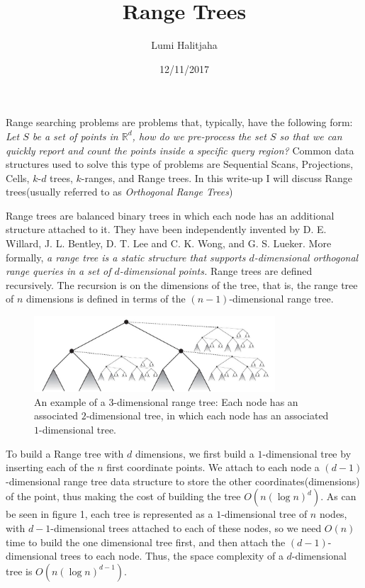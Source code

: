\documentclass[letterpaper,11pt]{article}
\title{Range Trees}
\author{Lumi Halitjaha}
\date{12/11/2017}
\begin{document}
\maketitle

Range searching problems are problems that, typically, have the following form: \textit{Let $S$ be a set of points in $\mathbb{R}^d$, how do we pre-process the set $S$ so that we can quickly report and count the points inside a specific query region?}\cite{chazelle1999advances} Common data structures used to solve this type of problems are Sequential Scans, Projections, Cells, $k$-$d$ trees, $k$-ranges, and Range trees.\cite[p.~398]{Friedman} In this write-up I will discuss Range trees(usually referred to as \textit{Orthogonal Range Trees})

Range trees are balanced binary trees in which each node has an additional structure attached to it.\cite{sturzurange} They have been independently invented by D. E. Willard, J. L. Bentley, D. T. Lee and C. K. Wong, and G. S. Lueker.\cite{willard}\cite[p.~404]{Friedman} More formally, \textit{a range tree is a static structure that supports $d$-dimensional orthogonal range queries in a set of $d$-dimensional points.}\cite{brass2008advanced} Range trees are defined recursively. The recursion is on the dimensions of the tree, that is, the range tree of $n$ dimensions is defined in terms of the $(n-1)$-dimensional range tree.\cite[p.~404]{Friedman}
\begin{figure}[ht!]
\centering
\includegraphics[width=90mm]{range_tree.JPG}
\caption{An example of a $3$-dimensional range tree: Each node has an associated  $2$-dimensional tree, in which each node has an associated $1$-dimensional tree.\cite[p.~183]{brass2008advanced} \label{overflow}}
\end{figure}

To build a Range tree with $d$ dimensions, we first build a $1$-dimensional tree by inserting each of the $n$ first coordinate points. We attach to each node a $(d-1)$-dimensional range tree data structure to store the other coordinates(dimensions) of the point, thus making the cost of building the tree $O(n(\log n)^d)$.\cite[p.~183]{brass2008advanced} As can be seen in figure 1, each tree is represented as a $1$-dimensional tree of $n$ nodes, with  $d-1$-dimensional trees attached to each of these nodes, so we need $O(n)$ time to build the one dimensional tree first, and then attach the $(d-1)$-dimensional trees to each node. Thus, the space complexity of a $d$-dimensional tree is $O(n(\log n)^{d-1})$.\cite[p.~183]{brass2008advanced}
\end{document}

